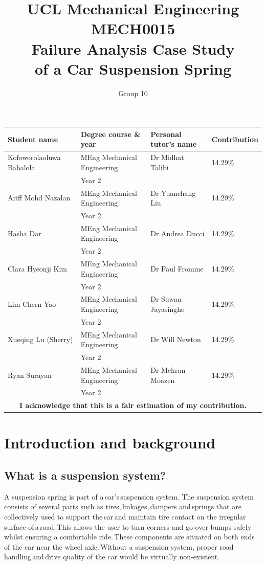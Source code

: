\documentclass[11pt]{article}
\begin{document}
\title{\textbf{UCL Mechanical Engineering}\\MECH0015\\ Failure Analysis Case Study\\
of a Car Suspension Spring}
\author{Group 10}
\maketitle
\begin{table}[H]
	\centering
	\begin{tabular}{@{}llll@{}}
      	\toprule
		Student name & Degree course \& year & Personal tutor's name & Contribution\\
		\midrule
		Kofoworolaoluwa Babalola & MEng Mechanical Engineering  & Dr Midhat Talibi&14.29\%\\
		& Year 2 & & \\
		Ariff Mohd Nazalan & MEng Mechanical Engineering & Dr Yuanchang Liu & 14.29\%\\
		& Year 2 & & \\
		Hasha Dar & MEng Mechanical Engineering  & Dr Andrea Ducci & 14.29\%\\ 
		& Year 2 & & \\
		Clara Hyeonji Kim & MEng Mechanical Engineering & Dr Paul Fromme & 14.29\%\\
		& Year 2 & & \\
		Lim Chern Yao & MEng Mechanical Engineering & Dr Suwan Jayasinghe & 14.29\%\\
		& Year 2 & & \\
		Xueqing Lu (Sherry) & MEng Mechanical Engineering  & Dr Will Newton & 14.29\%\\
		& Year 2 & & \\
		Ryan Surayan & MEng Mechanical Engineering  & Dr Mehran Moazen & 14.29\%\\
		& Year 2 & & \\
		\midrule
		\multicolumn{4}{c}{\textbf{I acknowledge that this is a fair estimation of my contribution.}} \\
      	\bottomrule
	\end{tabular}
\end{table} 
\tableofcontents
\listoffigures
\newpage
\section{Introduction and background}
\subsection{What is a suspension system?}
A suspension spring is part of a car’s suspension system. The suspension system consists of several parts such as tires, linkages, dampers and springs that are collectively used to support the car and maintain tire contact on the irregular surface of a road. This allows the user to turn corners and go over bumps safely whilst ensuring a comfortable ride. These components are situated on both ends of the car near the wheel axle. Without a suspension system, proper road handling and drive quality of the car would be virtually non-existent.   
\end{document}
